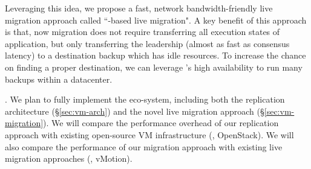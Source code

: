 Leveraging this idea, we propose a fast, network bandwidth-friendly live 
migration approach called ``\paxos-based live migration". A key benefit of this 
approach is that, now migration does not require transferring all execution 
states of application, but only transferring the \paxos leadership (almost as 
fast as \paxos consensus latency) to a destination backup which has idle 
resources. To increase the chance on finding a proper destination, we can 
leverage \falcon's high availability to run many backups within a datacenter.

% 
% 
% 


. We plan to fully implement the eco-system, including both 
the replication architecture (\S\ref{sec:vm-arch}) and the novel live 
migration approach (\S\ref{sec:vm-migration}). We will compare the 
performance overhead of our replication approach with existing open-source VM 
infrastructure (\eg, OpenStack). We will also compare the performance of our 
migration approach with existing live migration approaches (\eg, vMotion).



